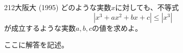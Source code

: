\begin{prob}{212}{}{大阪大 (1995)}
 どのような実数$x$に対しても、不等式
 \[ |x^3+ax^2+bx+c| \le |x^3| \]
 が成立するような実数$a, b, c$の値を求めよ。
\end{prob}
ここに解答を記述。